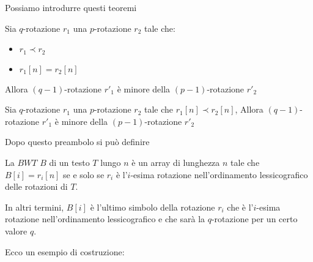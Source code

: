 Possiamo introdurre questi teoremi
\begin{teorema}
    Sia $q$-rotazione $r_1$ una $p$-rotazione $r_2$ tale che:
    \begin{itemize}
        \item $r_1\prec r_2$
        \item $r_1[n]=r_2[n]$
    \end{itemize}
    Allora $(q-1)$-rotazione $r'_1$ è minore della $(p-1)$-rotazione $r'_2$
\end{teorema}
\begin{teorema}
    Sia $q$-rotazione $r_1$ una $p$-rotazione $r_2$ tale che $r_1[n]\prec r_2[n]$,
    Allora $(q-1)$-rotazione $r'_1$ è minore della $(p-1)$-rotazione $r'_2$
\end{teorema}
Dopo questo preambolo si può definire
\begin{definizione}
    La $BWT$ $B$ di un testo $T$ lungo $n$ è un array di lunghezza $n$ tale che
    $B[i]=r_i[n]$ se e solo se $r_i$ è l'$i$-esima rotazione nell'ordinamento
    lessicografico delle rotazioni di $T$.

    In altri termini, $B[i]$ è l'ultimo simbolo della rotazione $r_i$ che è
    l'$i$-esima rotazione nell'ordinamento lessicografico e che sarà la
    $q$-rotazione per un certo valore $q$.
\end{definizione}
Ecco un esempio di costruzione:
